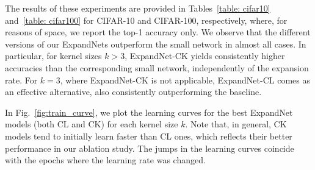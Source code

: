 \documentclass[10pt,twocolumn,letterpaper]{article}
\begin{document}
The results of these experiments are provided in Tables~\ref{table: cifar10} and~\ref{table: cifar100} for CIFAR-10 and CIFAR-100, respectively, where, for reasons of space, we report the top-1 accuracy only. We observe that the different versions of our ExpandNets outperform the small network in almost all cases. In particular, for kernel sizes $k>3$, ExpandNet-CK yields consistently higher accuracies than the corresponding small network, independently of the expansion rate. For $k=3$, where ExpandNet-CK is not applicable, ExpandNet-CL comes as an effective alternative, also consistently outperforming the baseline.

In Fig.~\ref{fig:train_curve}, we plot the learning curves for the best ExpandNet models (both CL and CK) for each kernel size $k$. Note that, in general, CK models tend to initially learn faster than CL ones, which reflects their better performance in our ablation study. The jumps in the learning curves coincide with the epochs where the learning rate was changed.
\end{document}
